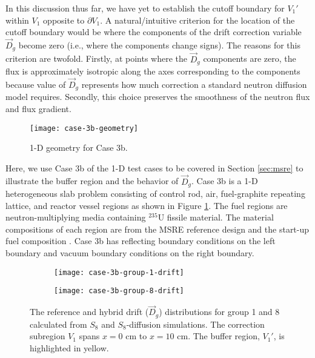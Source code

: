 In this discussion thus far, we have yet to establish the cutoff boundary for $V_1'$ within $V_1$
opposite to $\partial V_1$. A natural/intuitive criterion for the location of the cutoff boundary
would be where the components of the drift correction variable $\vec{D}_g$ become zero (i.e.,
where the components change signs). The reasons for this criterion are twofold. Firstly, at
points where the $\vec{D}_g$ components are zero, the flux is approximately isotropic along the
axes corresponding to the components because value of $\vec{D}_g$ represents how much correction a
standard neutron diffusion model requires. Secondly, this choice preserves the smoothness of the
neutron flux and flux gradient.
%
\begin{figure}[b]
	\centering
	\texttt{[image: case-3b-geometry]}
	\caption{1-D geometry for Case 3b.}
	\label{fig:3b-geometry}
\end{figure}

Here, we use Case 3b of the 1-D test cases to be covered in Section \ref{sec:msre} to illustrate
the buffer region and the behavior of $\vec{D}_g$. Case 3b is a 1-D heterogeneous slab problem
consisting of control rod, air, fuel-graphite repeating lattice, and reactor vessel regions as
shown in Figure \ref{fig:3b-geometry}. The fuel regions are neutron-multiplying media containing
$^\text{235}$U fissile material. The material compositions of each region are from the \gls{MSRE}
reference design and the start-up fuel composition \cite{fratoni_molten_2020}.
Case 3b has reflecting boundary conditions on the left boundary and vacuum boundary conditions on
the right boundary.
%
\begin{figure}[htb!]
    \centering
    \begin{subfigure}[t]{.49\textwidth}
        \centering
        \texttt{[image: case-3b-group-1-drift]}
    \end{subfigure}
    \hfill
    \begin{subfigure}[t]{.49\textwidth}
        \centering
        \texttt{[image: case-3b-group-8-drift]}
    \end{subfigure}
    \caption{The reference and hybrid drift ($\vec{D}_g$) distributions for group 1 and 8 calculated
      from $S_8$ and $S_8$-diffusion simulations. The correction subregion $V_1$ spans $x=0$ cm to
      $x=10$ cm. The buffer region, $V_1'$, is highlighted in yellow.}
    \label{fig:3b-drift-1}
\end{figure}

